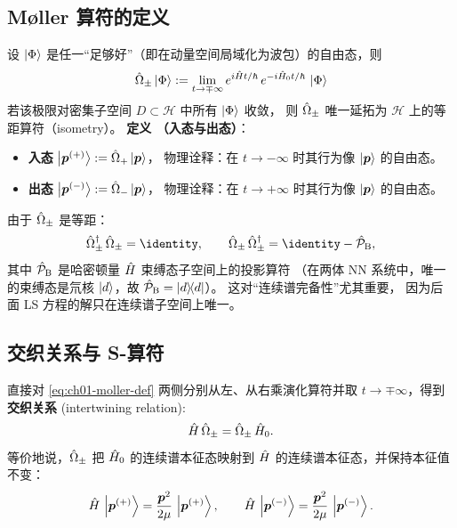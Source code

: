 \subsection{Møller 算符的定义}

设 $\ket{\Phi}$ 是任一“足够好”（即在动量空间局域化为波包）的自由态，则
\begin{equation}
  \hat{\Omega}_{\pm} \ket{\Phi}
  := \lim_{t \to \mp\infty}
        e^{i\hat{H} t / \hbar}\, e^{-i\hat{H}_0 t / \hbar}\, \ket{\Phi}
  \label{eq:ch01-moller-def}
\end{equation}
若该极限对密集子空间 $D \subset \mathcal{H}$ 中所有 $\ket{\Phi}$ 收敛，
则 $\hat{\Omega}_{\pm}$ 唯一延拓为 $\mathcal{H}$ 上的等距算符（isometry）。
\textbf{定义 \thedefinition\label{def:ch01-in-out}（入态与出态）}：

\begin{itemize}
  \item \textbf{入态} $\ket{\bm{p}^{(+)}} := \hat{\Omega}_{+} \ket{\bm{p}}$，
        物理诠释：在 $t \to -\infty$ 时其行为像 $\ket{\bm{p}}$ 的自由态。
  \item \textbf{出态} $\ket{\bm{p}^{(-)}} := \hat{\Omega}_{-} \ket{\bm{p}}$，
        物理诠释：在 $t \to +\infty$ 时其行为像 $\ket{\bm{p}}$ 的自由态。
\end{itemize}

由于 $\hat{\Omega}_{\pm}$ 是等距：
\begin{equation}
  \Mollerpm^{\dagger}\, \Mollerpm = \identity,
  \qquad
  \Mollerpm\, \Mollerpm^{\dagger} = \identity - \Pop_{\text{B}},
  \label{eq:ch01-moller-isom}
\end{equation}
其中 $\hat{\mathcal{P}}_{\text{B}}$ 是哈密顿量 $\hat{H}$ 束缚态子空间上的投影算符
（在两体 NN 系统中，唯一的束缚态是氘核 $\ket{d}$，故 $\hat{\mathcal{P}}_{\text{B}} = \ketbra{d}{d}$）。
这对“连续谱完备性”尤其重要，
因为后面 LS 方程的解只在连续谱子空间上唯一。

\subsection{交织关系与 S-算符}

直接对 \cref{eq:ch01-moller-def} 两侧分别从左、从右乘演化算符并取 $t \to \mp\infty$，得到\textbf{交织关系} (intertwining relation):
\begin{equation}
  \hat{H}\, \hat{\Omega}_{\pm} = \hat{\Omega}_{\pm}\, \hat{H}_0.
  \label{eq:ch01-intertwine}
\end{equation}
等价地说，$\hat{\Omega}_{\pm}$ 把 $\hat{H}_0$ 的连续谱本征态映射到 $\hat{H}$ 的连续谱本征态，并保持本征值不变：
\begin{equation}
  \hat{H}\, \ket{\bm{p}^{(+)}} = \frac{\bm{p}^2}{2\mu}\, \ket{\bm{p}^{(+)}}, \qquad
  \hat{H}\, \ket{\bm{p}^{(-)}} = \frac{\bm{p}^2}{2\mu}\, \ket{\bm{p}^{(-)}}.
  \label{eq:ch01-Hpsi-eigen}
\end{equation}

